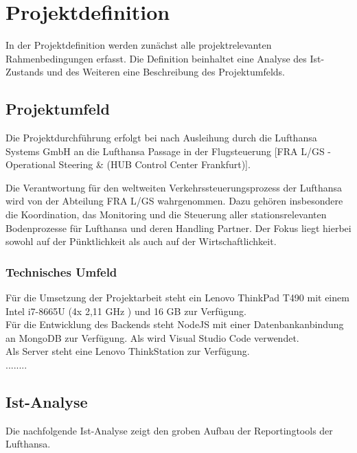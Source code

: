 \section{Projektdefinition}
	In der Projektdefinition werden zunächst alle projektrelevanten Rahmenbedingungen erfasst.
	Die Definition beinhaltet eine Analyse des Ist-Zustands und des Weiteren eine Beschreibung
	des Projektumfelds.

	\subsection{Projektumfeld}

		
		
		Die Projektdurchführung erfolgt bei nach Ausleihung durch die Lufthansa Systems GmbH an die Lufthansa Passage in der Flugsteuerung [FRA L/GS - Operational Steering \&  (HUB Control Center Frankfurt)].

		Die Verantwortung für den weltweiten Verkehrssteuerungsprozess der Lufthansa wird von der
		Abteilung FRA L/GS wahrgenommen. Dazu gehören insbesondere die Koordination, das
		Monitoring und die Steuerung aller stationsrelevanten Bodenprozesse für Lufthansa und deren
		Handling Partner. Der Fokus liegt hierbei sowohl auf der Pünktlichkeit als auch auf der
		Wirtschaftlichkeit.

		\subsubsection{Technisches Umfeld}
		
		Für die Umsetzung der Projektarbeit steht ein Lenovo ThinkPad T490 mit einem Intel i7-8665U (4x 2,11 GHz ) und 16 GB   zur Verfügung.\\
		Für die Entwicklung des Backends steht NodeJS mit einer Datenbankanbindung an MongoDB zur Verfügung. Als  wird Visual Studio Code verwendet.
		\\
		
		Als Server steht eine Lenovo ThinkStation zur Verfügung.\\
	........

		\subsection{Ist-Analyse}
		Die nachfolgende Ist-Analyse zeigt den groben Aufbau der Reportingtools der Lufthansa.\\

